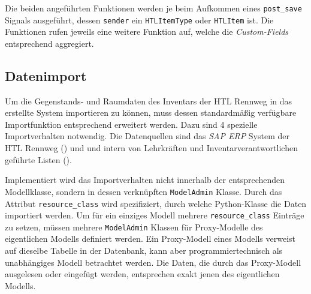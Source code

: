 Die beiden angeführten Funktionen werden je beim Aufkommen eines
\texttt{post\_save} Signals \cite{django-doku-signals} ausgeführt,
dessen \texttt{sender} ein \texttt{HTLItemType} oder \texttt{HTLItem}
ist. Die Funktionen rufen jeweils eine weitere Funktion auf, welche die
\emph{Custom-Fields} entsprechend aggregiert.

\hypertarget{datenimport}{%
\subsection{Datenimport}\label{datenimport}}

Um die Gegenstands- und Raumdaten des Inventars der HTL Rennweg in das
erstellte System importieren zu können, muss dessen standardmäßig
verfügbare Importfunktion entsprechend erweitert werden. Dazu sind 4
spezielle Importverhalten notwendig. Die Datenquellen sind das
\emph{SAP ERP}
System der HTL Rennweg () und und
intern von Lehrkräften und Inventarverantwortlichen geführte Listen
().

Implementiert wird das Importverhalten nicht innerhalb der
entsprechenden Modellklasse, sondern in dessen verknüpften
\texttt{ModelAdmin} Klasse. Durch das Attribut \texttt{resource\_class}
wird spezifiziert, durch welche Python-Klasse die Daten importiert
werden. Um für ein einziges Modell mehrere \texttt{resource\_class}
Einträge zu setzen, müssen mehrere \texttt{ModelAdmin} Klassen für
Proxy-Modelle \cite{django-doku-models} des eigentlichen Modells
definiert werden. Ein Proxy-Modell eines Modells verweist auf dieselbe
Tabelle in der Datenbank, kann aber programmiertechnisch als
unabhängiges Modell betrachtet werden. Die Daten, die durch das
Proxy-Modell ausgelesen oder eingefügt werden, entsprechen exakt jenen
des eigentlichen Modells.

\begin{Shaded}
\begin{Highlighting}[]
\OperatorTok{=} 

\NormalTok{())}
\NormalTok{())}

\OperatorTok{=}
\end{Highlighting}
\end{Shaded}

